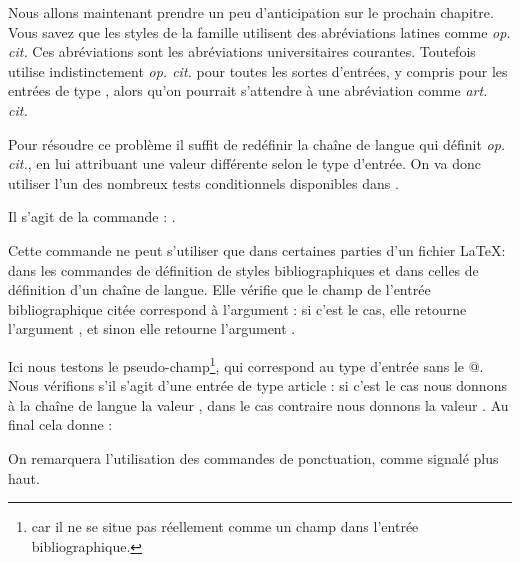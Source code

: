 Nous allons maintenant prendre un peu d'anticipation sur le prochain chapitre.
Vous savez  que les styles de la famille  utilisent des abréviations latines comme \emph{op. cit.}
Ces abréviations sont les abréviations universitaires courantes. Toutefois    utilise indistinctement \emph{op. cit.} pour toutes les sortes d'entrées, y compris pour les entrées de type , alors qu'on pourrait s'attendre à une abréviation comme \emph{art. cit.}

Pour résoudre ce problème il suffit de redéfinir la chaîne de langue qui définit \emph{op. cit.}, en lui attribuant une valeur différente selon le type d'entrée.  On va donc utiliser l'un des nombreux tests conditionnels disponibles dans . 

Il s'agit de la commande : .

Cette commande ne peut s'utiliser que dans certaines parties d'un fichier \LaTeX : dans les commandes de définition de styles bibliographiques et  dans celles de définition d'un chaîne de langue. 
Elle vérifie que le champ     de l'entrée bibliographique citée correspond à l'argument : si c'est le cas, elle retourne l'argument , et sinon elle retourne l'argument .

Ici nous testons le pseudo-champ\footnote{ car il ne se situe pas réellement comme un champ dans l'entrée bibliographique.}, qui correspond au type d'entrée sans le @. Nous vérifions  s'il s'agit d'une entrée de type article : si c'est le cas nous donnons à la chaîne de langue la valeur  ,  dans le cas contraire nous donnons la valeur .
Au final cela donne : 

\begin{latexcode}
\end{latexcode}


On remarquera l'utilisation des commandes de ponctuation, comme signalé plus haut.



    
